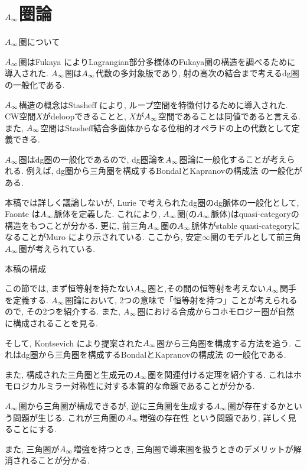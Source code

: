 \documentclass[aspectratio=169, dvipdfmx, 8pt, notheorems, uplatex]{beamer}
\begin{document}
\section{$A_\infty$圏論}

\begin{frame}{$A_\infty$圏について}
  \begin{block}{}
    $A_\infty$圏はFukaya \cite{Fuk93}\cite{Fuk96}によりLagrangian部分多様体のFukaya圏の構造を調べるために導入された. 
    $A_\infty$圏は$A_\infty$代数の多対象版であり, 射の高次の結合まで考えるdg圏の一般化である. \bigskip

    $A_\infty$構造の概念はStasheff \cite{Sta63}により, ループ空間を特徴付けるために導入された. 
    CW空間$X$がdeloopできることと, $X$が$A_\infty$空間であることは同値であると言える. 
    また, $A_\infty$空間はStasheff結合多面体からなる位相的オペラドの上の代数として定義できる. \bigskip

    $A_\infty$圏はdg圏の一般化であるので, dg圏論を$A_\infty$圏論に一般化することが考えられる. 
    例えば, dg圏から三角圏を構成するBondalとKapranovの構成法 \cite{BK}の一般化がある. \bigskip

    本稿では詳しく議論しないが, Lurie \cite{HTT}で考えられたdg圏のdg脈体の一般化として, Faonte \cite{Fao}は$A_\infty$脈体を定義した.
    これにより, $A_\infty$圏(の$A_\infty$脈体)はquasi-categoryの構造をもつことが分かる. 
    更に, 前三角$A_\infty$圏の$A_\infty$脈体がstable quasi-categoryになることがMuro \cite{Orn}により示されている. 
    ここから, 安定$\infty$圏のモデルとして前三角$A_\infty$圏が考えられている. 
  \end{block}
\end{frame}

\begin{frame}{本稿の構成}
  \begin{block}{}
    この節では, まず恒等射を持たない$A_\infty$圏と,その間の恒等射を考えない$A_\infty$関手を定義する. 
    $A_\infty$圏論において, 2つの意味で「恒等射を持つ」ことが考えられるので, その2つを紹介する. 
    また, $A_\infty$圏における合成からコホモロジー圏が自然に構成されることを見る. \bigskip
    
    そして, Kontsevich \cite{Kon94}により提案された$A_\infty$圏から三角圏を構成する方法を追う. 
    これはdg圏から三角圏を構成するBondalとKapranovの構成法 \cite{BK}の一般化である. \bigskip

    また, 構成された三角圏と生成元の$A_\infty$圏を関連付ける定理を紹介する. 
    これはホモロジカルミラー対称性に対する本質的な命題であることが分かる. \bigskip

    $A_\infty$圏から三角圏が構成できるが, 逆に三角圏を生成する$A_\infty$圏が存在するかという問題が生じる.
    これが三角圏の$A_\infty$増強の存在性 \cite{Muro07}という問題であり, 詳しく見ることにする. \bigskip

    また, 三角圏が$A_\infty$増強を持つとき, 三角圏で導来圏を扱うときのデメリットが解消されることが分かる. 
  \end{block}
\end{frame}
\end{document}
